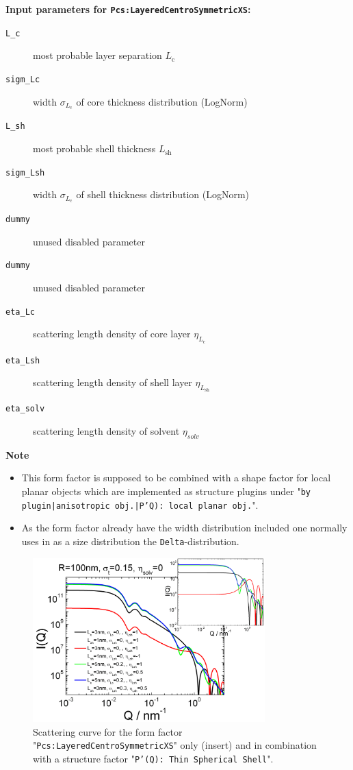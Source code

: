 \noindent
\textbf{Input parameters for \texttt{Pcs:LayeredCentroSymmetricXS}:}
\begin{description}
    \item[\texttt{L\_c}] most probable layer separation $L_\textrm{c}$
    \item[\texttt{sigm\_Lc}] width $\sigma_{L_\textrm{c}}$ of core thickness distribution (LogNorm)
    \item[\texttt{L\_sh}] most probable shell thickness $L_\textrm{sh}$
    \item[\texttt{sigm\_Lsh}] width $\sigma_{L_\textrm{c}}$ of shell thickness distribution (LogNorm)
    \item[\texttt{dummy}] unused disabled parameter
    \item[\texttt{dummy}] unused disabled parameter
    \item[\texttt{eta\_Lc}] scattering length density of core layer $\eta_{L_\textrm{c}}$
    \item[\texttt{eta\_Lsh}] scattering length density of shell layer $\eta_{L_\textrm{sh}}$
    \item[\texttt{eta\_solv}] scattering length density of solvent $\eta_{solv}$
\end{description}

\noindent
\textbf{Note}
\begin{itemize}
  \item This form factor is supposed to be combined with a shape factor for
local planar objects which are implemented as structure  plugins
under "\texttt{by plugin|anisotropic obj.|P'Q): local planar
obj.}".
\item As the form factor already have the width distribution included one normally uses in \SASfit as a size distribution
the \texttt{Delta}-distribution.
\end{itemize}

\begin{figure}[htb]
\begin{center}
\includegraphics[width=0.8\textwidth,height=0.55\textwidth]{../images/form_factor/anisotropic/Pcs_planar2centrosymmIQ.png}
\end{center}
\caption{Scattering curve for the form factor "\texttt{Pcs:LayeredCentroSymmetricXS}" only (insert) and
in combination with a structure factor "\texttt{P'(Q): Thin Spherical Shell}".}
\label{fig:Pcs_planar2centrosymmIQ}
\end{figure}

